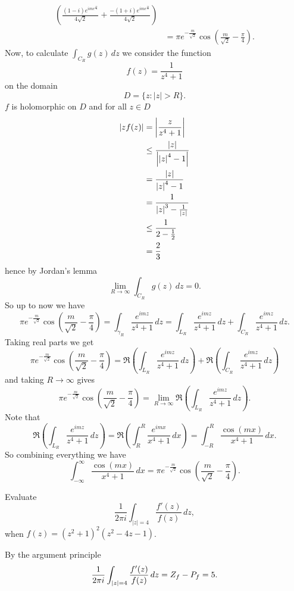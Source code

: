 \begin{solution}
\begin{align*}
        \left(
            \frac{(1-i)e^{ime^{\frac{i\pi}4}}}{4\sqrt 2}
            + \frac{-(1+i)e^{ime^{\frac{i\pi}4}}}{4\sqrt 2}
        \right) \\
        &= \pi e^{-\frac{m}{\sqrt 2}} \cos\left(\frac{m}{\sqrt 2} - \frac{\pi}4\right).
    \end{align*}
    Now, to calculate $\int_{C_R} g(z) \,dz$ we consider the function
    \[
        f(z) = \frac1{z^4+1}
    \]
    on the domain
    \[
        D = \{z: \lvert z \rvert > R\}.
    \]
    $f$ is holomorphic on $D$ and for all $z \in D$
    \begin{align*}
              \left\lvert zf(z)\right\rvert
        &=    \left\lvert\frac z{z^4 + 1}\right\rvert \\
        &\leq \frac{\left\lvert z\right\rvert}{\left\lvert\left\lvert z\right\rvert^4  - 1\right\rvert} \\
        &=    \frac{\left\lvert z\right\rvert}{\left\lvert z\right\rvert^4 - 1} \\
        &=    \frac{1}{\left\lvert z\right\rvert^3 - \frac{1}{\left\lvert z\right\rvert}} \\
        &\leq \frac{1}{2 - \frac12} \\
        &=    \frac23
    \end{align*}
    hence by Jordan's lemma
    \[
        \lim_{R \to \infty} \int_{C_R} g(z) \,dz = 0.
    \]
    So up to now we have
    \[
        \pi e^{-\frac{m}{\sqrt 2}} \cos\left(\frac{m}{\sqrt 2} - \frac{\pi}4\right)
        = \int_{\gamma_R} \frac{e^{imz}}{z^4 + 1} \,dz
        = \int_{L_R} \frac{e^{imz}}{z^4 + 1} \,dz
            + \int_{C_R} \frac{e^{imz}}{z^4 + 1} \,dz.
    \]
    Taking real parts we get
    \[
        \pi e^{-\frac{m}{\sqrt 2}} \cos\left(\frac{m}{\sqrt 2} - \frac{\pi}4\right)
        = \Re\left(\int_{L_R} \frac{e^{imz}}{z^4 + 1} \,dz\right)
        + \Re\left(\int_{C_R} \frac{e^{imz}}{z^4 + 1} \,dz\right)
    \]
    and taking $R \to \infty$ gives
    \[
        \pi e^{-\frac{m}{\sqrt 2}} \cos\left(\frac{m}{\sqrt 2} - \frac{\pi}4\right)
        = \lim_{R \to \infty} \Re\left(\int_{L_R} \frac{e^{imz}}{z^4 + 1} \,dz\right).
    \]
    Note that
    \[
        \Re\left(\int_{L_R} \frac{e^{imz}}{z^4 + 1} \,dz\right)
        = \Re\left(\int_{R}^{R} \frac{e^{imx}}{x^4 + 1} \,dx\right)
        = \int_{-R}^{R} \frac{\cos(mx)}{x^4 + 1} \,dx.
    \]
    So combining everything we have
    \[
        \int_{-\infty}^{\infty} \frac{\cos(mx)}{x^4 + 1} \,dx
        = \pi e^{-\frac{m}{\sqrt 2}} \cos\left(\frac{m}{\sqrt 2} - \frac{\pi}4\right).
    \]
\end{solution}

\setcounter{question}{3}
\question 
Evaluate
\[
    \frac{1}{2\pi i} \int_{\lvert z \rvert = 4} \frac{f'(z)}{f(z)} \,dz,
\]
when $f(z) = (z^2 + 1)^2(z^2-4z-1)$.
\begin{solution}
    By the argument principle
    \[
        \frac{1}{2\pi i} \int_{\left\lvert z\right\rvert = 4} \frac{f'(z)}{f(z)} \,dz
        = Z_f - P_f 
        = 5.
    \]
\end{solution}

